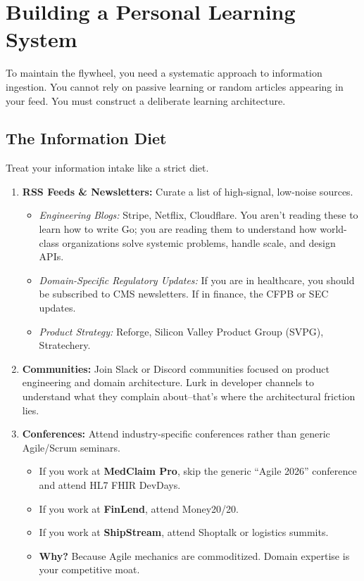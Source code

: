 \documentclass[
  11pt,
  openany,
  oneside]{book}
\providecommand{\tightlist}{%
  \setlength{\itemsep}{0pt}\setlength{\parskip}{0pt}}
\begin{document}
\bigskip

\section{Building a Personal Learning
System}\label{building-a-personal-learning-system}

To maintain the flywheel, you need a systematic approach to information
ingestion. You cannot rely on passive learning or random articles
appearing in your feed. You must construct a deliberate learning
architecture.

\subsection{The Information Diet}\label{the-information-diet}

Treat your information intake like a strict diet.

\begin{enumerate}
\def\labelenumi{\arabic{enumi}.}
\tightlist
\item
  \textbf{RSS Feeds \& Newsletters:} Curate a list of high-signal,
  low-noise sources.

  \begin{itemize}
  \tightlist
  \item
    \emph{Engineering Blogs:} Stripe, Netflix, Cloudflare. You aren't
    reading these to learn how to write Go; you are reading them to
    understand how world-class organizations solve systemic problems,
    handle scale, and design APIs.
  \item
    \emph{Domain-Specific Regulatory Updates:} If you are in healthcare,
    you should be subscribed to CMS newsletters. If in finance, the CFPB
    or SEC updates.
  \item
    \emph{Product Strategy:} Reforge, Silicon Valley Product Group
    (SVPG), Stratechery.
  \end{itemize}
\item
  \textbf{Communities:} Join Slack or Discord communities focused on
  product engineering and domain architecture. Lurk in developer
  channels to understand what they complain about--that's where the
  architectural friction lies.
\item
  \textbf{Conferences:} Attend industry-specific conferences rather than
  generic Agile/Scrum seminars.

  \begin{itemize}
  \tightlist
  \item
    If you work at \textbf{MedClaim Pro}, skip the generic ``Agile
    2026'' conference and attend HL7 FHIR DevDays.
  \item
    If you work at \textbf{FinLend}, attend Money20/20.
  \item
    If you work at \textbf{ShipStream}, attend Shoptalk or logistics
    summits.
  \item
    \textbf{Why?} Because Agile mechanics are commoditized. Domain
    expertise is your competitive moat.
  \end{itemize}
\end{enumerate}
\end{document}
